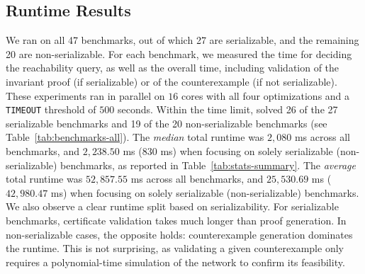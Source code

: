 \subsection{Runtime Results}
We ran \toolname{} on all 47 benchmarks, out of which 27 are serializable, and the remaining 20 are non-serializable. 
For each benchmark, we measured the time for deciding the reachability query, as well as the overall time, including validation of the invariant proof (if serializable) or of the counterexample (if not serializable). These experiments ran in parallel on $16$ cores with all four optimizations and a \texttt{TIMEOUT} threshold of $500$ seconds.
%
Within the time limit, \toolname{} solved 26 of the 27 serializable benchmarks and 19 of the 20 non-serializable benchmarks (see Table~\ref{tab:benchmarks-all}).
%
%
The \textit{median} total runtime was $2{,}080$ ms across all benchmarks, and $2{,}238.50$ ms ($830$ ms) when focusing on solely serializable (non-serializable) benchmarks, as reported in Table~\ref{tab:stats-summary}.
%
The \textit{average} total runtime was $52{,}857.55$ ms across all benchmarks, and $25{,}530.69$ ms ($42{,}980.47$ ms) when focusing on solely serializable (non-serializable) benchmarks.
%
We also observe a clear runtime split based on serializability. For serializable benchmarks, certificate validation takes much longer than proof generation. In non-serializable cases, the opposite holds: counterexample generation dominates the runtime. This is not surprising, as validating a given counterexample only requires a polynomial-time simulation of the network to confirm its feasibility.
%
%


